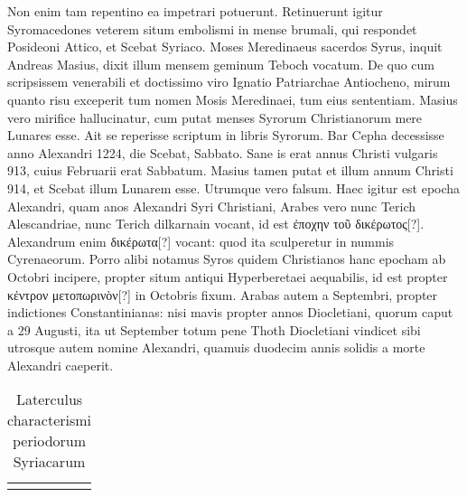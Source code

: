 Non enim tam repentino ea impetrari potuerunt.
Retinuerunt
igitur Syromacedones veterem situm embolismi in mense brumali,
qui respondet Posideoni Attico, et Scebat Syriaco.
Moses
Meredinaeus sacerdos Syrus, inquit Andreas Masius, dixit illum mensem
geminum Teboch vocatum.
De quo cum scripsissem venerabili et
doctissimo viro Ignatio Patriarchae Antiocheno, mirum quanto risu
exceperit tum nomen Mosis Meredinaei, tum eius sententiam.
Masius
vero mirifice hallucinatur, cum putat menses Syrorum Christianorum
mere Lunares esse.
Ait se reperisse scriptum in libris Syrorum.
Bar Cepha decessisse anno Alexandri 1224,
 die  Scebat, Sabbato.
Sane is erat annus Christi vulgaris 913, cuius  Februarii erat
Sabbatum.
Masius tamen putat et illum annum Christi 914, et Scebat
illum Lunarem esse.
Utrumque vero falsum.
Haec igitur est
epocha Alexandri, quam anos Alexandri Syri Christiani, Arabes
vero nunc Terich Alescandriae, nunc Terich dilkarnain vocant, id est
\textgreek{ἐποχην τοῦ δικέρωτος[?]}.
Alexandrum enim \textgreek{δικέρωτα[?]} vocant: quod ita sculperetur
in nummis Cyrenaeorum.
Porro alibi notamus Syros quidem
Christianos hanc epocham ab Octobri incipere, propter situm antiqui
Hyperberetaei aequabilis, id est propter
 \textgreek{κέντρον μετοπωρινὸν[?]} in 
Octobris fixum.
Arabas autem a Septembri, propter indictiones Constantinianas:
nisi mavis propter annos Diocletiani, quorum caput a 29
Augusti, ita ut September totum pene Thoth Diocletiani vindicet sibi
utrosque autem nomine Alexandri, quamuis duodecim annis solidis
a morte Alexandri caeperit.

\begin{table}[htbp]
  \centering
  \begin{tabular}{c c}
    \begin{minipage}[][0.44\linewidth][t]{0.4\linewidth}
      
      \caption{Menses Syrorum}
      \label{tab:memses_syrorum}
    \end{minipage}
&
    \begin{minipage}[][0.44\linewidth][t]{0.4\linewidth}
      
      \caption{Laterculus characterismi periodorum Syriacarum}
      \label{tab:characterismi_periodorum_syriacarum}
    \end{minipage}
  \end{tabular}
\end{table}

